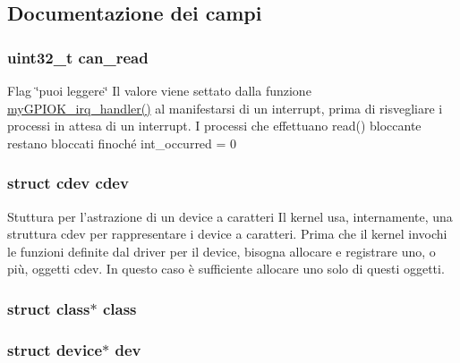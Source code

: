 \subsection{Documentazione dei campi}
\hypertarget{structmy_g_p_i_o_k__t_a2b8d3d6037e2d2fdadbd7c2fd995f0a1}{
\subsubsection[{can\+\_\+read}]{\setlength{\rightskip}{0pt plus 5cm}uint32\+\_\+t can\+\_\+read}}\label{structmy_g_p_i_o_k__t_a2b8d3d6037e2d2fdadbd7c2fd995f0a1}
Flag \char`\"{}puoi leggere\char`\"{} Il valore viene settato dalla funzione \hyperlink{group___linux-_driver_ga2fc230a12a97aa63e43b2dc4aec73511}{my\+G\+P\+I\+O\+K\+\_\+irq\+\_\+handler()} al manifestarsi di un interrupt, prima di risvegliare i processi in attesa di un interrupt. I processi che effettuano read() bloccante restano bloccati finoché int\+\_\+occurred = 0 \hypertarget{structmy_g_p_i_o_k__t_acba682fe45d5a1501790dbdb1d99bd6a}{
\subsubsection[{cdev}]{\setlength{\rightskip}{0pt plus 5cm}struct cdev cdev}}\label{structmy_g_p_i_o_k__t_acba682fe45d5a1501790dbdb1d99bd6a}
Stuttura per l'astrazione di un device a caratteri Il kernel usa, internamente, una struttura cdev per rappresentare i device a caratteri. Prima che il kernel invochi le funzioni definite dal driver per il device, bisogna allocare e registrare uno, o più, oggetti cdev. In questo caso è sufficiente allocare uno solo di questi oggetti. \hypertarget{structmy_g_p_i_o_k__t_a9b6474dd18270738a5c4853fd93b5e70}{
\subsubsection[{class}]{\setlength{\rightskip}{0pt plus 5cm}struct class$\ast$ class}}\label{structmy_g_p_i_o_k__t_a9b6474dd18270738a5c4853fd93b5e70}
\hypertarget{structmy_g_p_i_o_k__t_acf6a82c73e7a9d99293d9ce0b8837faf}{
\subsubsection[{dev}]{\setlength{\rightskip}{0pt plus 5cm}struct device$\ast$ dev}}\label{structmy_g_p_i_o_k__t_acf6a82c73e7a9d99293d9ce0b8837faf}

